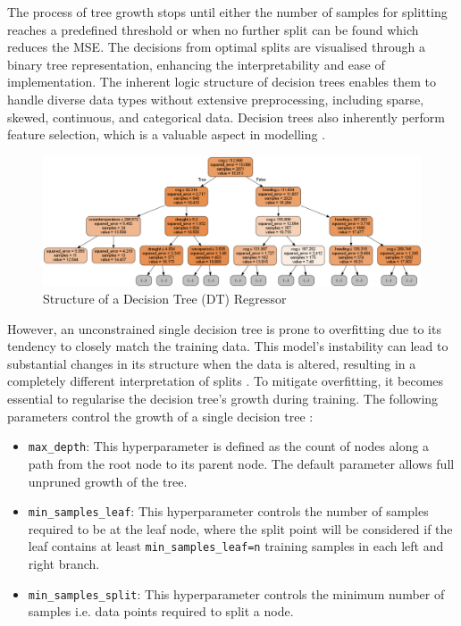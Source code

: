 \documentclass[]{interact}
\theoremstyle{plain}%
\theoremstyle{definition}
\theoremstyle{remark}
\begin{document}
The process of tree growth stops until either the number of samples for splitting reaches a predefined threshold or when no further split can be found which reduces the MSE. The decisions from optimal splits are visualised through a binary tree representation, enhancing the interpretability and ease of implementation. The inherent logic structure of decision trees enables them to handle diverse data types without extensive preprocessing, including sparse, skewed, continuous, and categorical data. Decision trees also inherently perform feature selection, which is a valuable aspect in modelling \citep{Kuhn.2013}.\\

\begin{figure}
  \label{fig:dtr_tree_trained}
  \centering
  \includegraphics[width=.9\textwidth]{00_figures/dtr_mod_1tree.png}
  \caption{Structure of a Decision Tree (DT) Regressor}
\end{figure}

However, an unconstrained single decision tree is prone to overfitting due to its tendency to closely match the training data. This model's instability can lead to substantial changes in its structure when the data is altered, resulting in a completely different interpretation of splits \citep{Hastie.2009, Kuhn.2013}. To mitigate overfitting, it becomes essential to regularise the decision tree's growth during training. The following parameters control the growth of a single decision tree : 

\begin{itemize}
  \item \texttt{max\_depth}: This hyperparameter is defined as the count of nodes along a path from the root node to its parent node. The default parameter allows full unpruned growth of the tree.
  \item \texttt{min\_samples\_leaf}: This hyperparameter controls the number of samples required to be at the leaf node, where the split point will be considered if the leaf contains at least {\tt min\_samples\_leaf=n} training samples in each left and right branch.
  \item \texttt{min\_samples\_split}: This hyperparameter controls the minimum number of samples i.e. data points required to split a node.    
\end{itemize}
\end{document}
